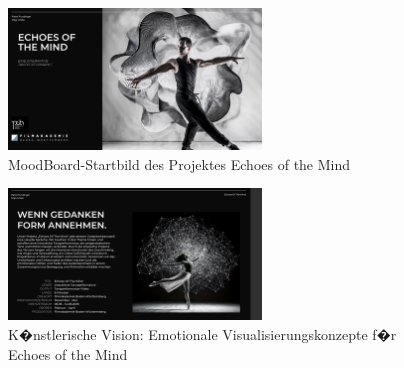 
\begin{figure}[!htbp]
    \centering
    \includegraphics[width=0.6\textwidth,height=0.25\textheight,keepaspectratio]{images/EchoesOfTheMind_startbild.png}
    \caption{MoodBoard-Startbild des Projektes \glqq Echoes of the Mind\grqq{}}
    \label{fig:echoes_startbild}
\end{figure}

\begin{figure}[!htbp]
    \centering
    \includegraphics[width=0.6\textwidth,height=0.25\textheight,keepaspectratio]{images/EchoesOfTheMind_mood.png}
    \caption{K�nstlerische Vision: Emotionale Visualisierungskonzepte f�r \glqq Echoes of the Mind\grqq{}}
    \label{fig:echoes_mood}
\end{figure}

